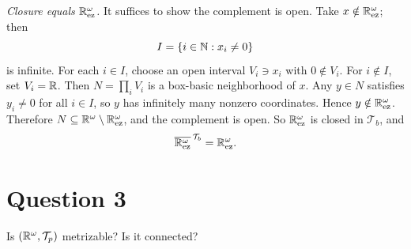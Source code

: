 \documentclass{article}
\begin{document}
\begin{solution}
  \emph{Closure equals $\mathbb{R}^\omega_{\mathrm{ez}}$.}
  It suffices to show the complement is open.
  Take $x\notin \mathbb{R}^\omega_{\mathrm{ez}}$; then
  \[
    I=\{i\in\mathbb{N}: x_i\ne 0\}
  \]
  is infinite.
  For each $i\in I$, choose an open interval $V_i\ni x_i$ with $0\notin V_i$.
  For $i\notin I$, set $V_i=\mathbb{R}$.
  Then $N=\prod_i V_i$ is a box-basic neighborhood of $x$.
  Any $y\in N$ satisfies $y_i\ne 0$ for all $i\in I$, so $y$ has
  infinitely many nonzero coordinates.
  Hence $y\notin \mathbb{R}^\omega_{\mathrm{ez}}$.
  Therefore $N\subseteq \mathbb{R}^\omega\setminus \mathbb{R}^\omega_{\mathrm{ez}}$,
  and the complement is open.
  So $\mathbb{R}^\omega_{\mathrm{ez}}$ is closed in $\mathcal{T}_b$, and
  \[
    \overline{\mathbb{R}^\omega_{\mathrm{ez}}}^{\,\mathcal{T}_b}=\mathbb{R}^\omega_{\mathrm{ez}}.
  \]
\end{solution}

\section{Question 3}

Is $(\mathbb{R}^\omega,\mathcal{T}_p)$ metrizable? Is it connected?
\end{document}
